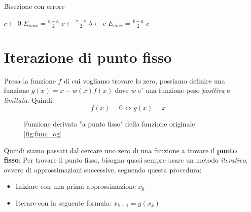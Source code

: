 \documentclass{report}
\begin{document}
\vspace{3mm}
\begin{algorithm}[H]
\caption{Bisezione con errore}
\SetAlgoLined
\SetNoFillComment
\vspace{3mm}
$c \leftarrow 0$\;
$ E_{max} = \frac{b-a}{2} $\;
 {
    $ c \gets \frac{a+b}{2} $\;
     {
      $ b \gets c $
    }
    $ E_{max} = \frac{b-a}{2} $
}
\Return $ c $
\end{algorithm}

\section{Iterazione di punto fisso}
Presa la funzione $ f $ di cui vogliamo trovare lo zero, possiamo definire una funzione $ g(x) = x-w(x)f(x) $ dove $ w $ e' una funzione peso \textit{positiva} e \textit{limitata}. Quindi:
\[
  f(x) = 0 \iff g(x) = x
\]


\begin{figure}[h!]
  \centering
  
  \caption{Funzione derivata "a punto fisso" della funzione originale \ref{fig:func_og}}
\end{figure}



Quindi siamo passati dal cercare uno zero di una funzione a trovare il \textbf{punto fisso}:
Per trovare il punto fisso, bisogna quasi sempre usare un metodo \textit{iterativo}, ovvero di approssimazioni successive, seguendo questa procedura:
\begin{itemize}
\item Iniziare con una prima approssimazione $ x_0 $
\item Iterare con la seguente formula: $ x_{k+1} = g(x_{k}) $
\end{itemize}

\end{document}
